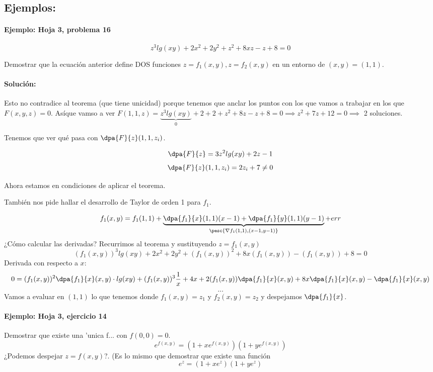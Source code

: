 \subsection{Ejemplos:}
\paragraph{Ejemplo: Hoja 3, problema 16}

$$z^3lg(xy) + 2x^2 + 2y^2 +z^2 + 8xz - z + 8 =0$$

Demostrar que la ecuación anterior define DOS funciones $z = f_1(x,y), z = f_2(x,y)$ en un entorno de $(x,y)=(1,1)$.

\paragraph{Solución: }

Esto no contradice al teorema (que tiene unicidad) porque tenemos que anclar los puntos con los que vamos a trabajar en los que $F(x,y,z) = 0$. Asíque vamso a ver $F(1,1,z) = \underbrace{z^3lg(xy)}_{0} + 2 + 2 + z^2 + 8z -z +8 = 0 \implies z^2+7z+12 = 0 \implies $ 2 soluciones.

Tenemos que ver qué pasa con $\displaystyle \dpa{F}{z}(1,1,z_i)$.

\[\dpa{F}{z} = 3z^2lg(xy) + 2z -1\]
\[\dpa{F}{z}(1,1,z_i) = 2z_i + 7 \neq 0\]

Ahora estamos en condiciones de aplicar el teorema.

También nos pide hallar el desarrollo de Taylor de orden 1 para $f_1$.

\[f_1(x,y) = f_1(1,1) + \underbrace{\dpa{f_1}{x}(1,1)(x-1) + \dpa{f_1}{y}(1,1) (y-1)}_{\pesc{\nabla f_1(1,1),(x-1,y-1)}} + err\]
¿Cómo calcular las derivadas? Recurrimos al teorema y sustituyendo $z=f_1(x,y)$
\[(f_1(x,y))^3 lg(xy) + 2x^2 + 2y^2 + (f_1(x,y))^2 + 8x(f_1(x,y))-(f_1(x,y))+8 = 0\]
Derivada con respecto a $x$:
\[ 0 = (f_1(x,y))^2\dpa{f_1}{x}(x,y)\cdot lg(xy) + (f_1(x,y))^3 \frac{1}{x}+4x + 2(f_1(x,y))\dpa{f_1}{x}(x,y) + 8x\dpa{f_1}{x}(x,y) - \dpa{f_1}{x}(x,y)\]
\[...\]
Vamos a evaluar en $(1,1)$ lo que tenemos donde $f_1(x,y) = z_1$ y $f_2(x,y) = z_2$ y despejamos $\dpa{f_1}{x}$.

\paragraph{Ejemplo: Hoja 3, ejercicio 14}

Demostrar que existe una 'unica f... con $f(0,0) = 0$.
$$e^{f(x,y)} = (1+xe^{f(x,y)})(1+ye^{f(x,y)})$$
¿Podemos despejar $z = f(x,y)$?. (Es lo mismo que demostrar que existe una función $$e^{z} = (1+xe^z)(1+ye^z)$$

